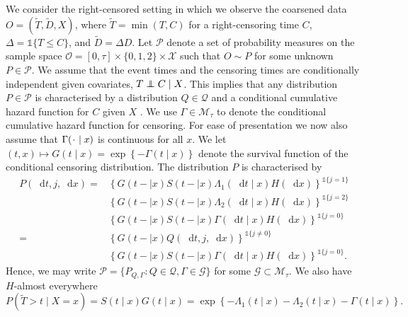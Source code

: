 \documentclass[a4paper,danish]{article}
\theoremstyle{plain} %
\numberwithin{theorem}{section}
\theoremstyle{definition} %
\theoremstyle{remark}
\newcommand{\blank}{\makebox[1ex]{\textbf{$\cdot$}}}
\newcommand\independent{\protect\mathpalette{\protect\independenT}{\perp}}
\def\independenT#1#2{\mathrel{\rlap{$#1#2$}\mkern2mu{#1#2}}}
\newcommand*\diff{\mathop{}\!\mathrm{d}}
\newcommand{\1}{\mathds{1}}
\begin{document}
We consider the right-censored setting in which we observe the coarsened data
\(O = (\tilde{T},\tilde D, X)\), where $\tilde T = \min(T,C)$ for a
right-censoring time \(C\), $\Delta = \1{\{T \leq C\}}$, and
\(\tilde D=\Delta D\). Let \(\mathcal{P}\) denote a set of probability
measures on the sample space
\(\mathcal{O} = [0, \tau] \times \{0, 1, 2\} \times \mathcal{X}\) such
that \(O \sim P \) for some unknown \(P\in \mathcal{P}\). We assume
that the event times and the censoring times are conditionally
independent given covariates, \( T \independent C \mid X \). This
implies that any distribution \( P \in \mathcal{P} \) is characterised
by a distribution \( Q \in \mathcal{Q} \) and a conditional cumulative
hazard function for \( C \) given \( X \)
\citep[c.f.,][]{begun1983information,gill1997coarsening}. We use
\(\Gamma\in\mathcal{M}_{\tau}\) to denote the conditional cumulative hazard
function for censoring. For ease of presentation we now also assume
that \( \Gamma(\blank \mid x) \) is continuous for all \( x \). We let
\((t,x)\mapsto G(t \mid x)=\exp\left\{-\Gamma(t \mid x)\right\}\) denote the
survival function of the conditional censoring distribution. The
distribution \( P \) is characterised by
\begin{equation}\label{eq:parametrizeP}
  \begin{split}
    P(\diff t, j, \diff x) =& \left\{G(t- \mid x)S(t- \mid x)\Lambda_1(\diff t \mid x)H(\diff x)\right\}^{\1{{\{j=1\}}}}\\
                            & \left\{G(t- \mid x)S(t- \mid x)\Lambda_2(\diff t \mid x)H(\diff x)\right\}^{\1{{\{j=2\}}}}\\
                            & \left\{G(t- \mid x)S(t- \mid x)\Gamma(\diff t \mid x)H(\diff x)\right\}^{\1{{\{j=0\}}}}\\
    = & \left\{G(t- \mid x)Q(\diff t,j,\diff x)\right\}^{\1{{\{j\ne 0\}}}}\\    
                            & \left\{G(t- \mid x)S(t- \mid x)\Gamma(\diff t \mid x)H(\diff x)\right\}^{\1{{\{j=0\}}}}.
  \end{split}
\end{equation}
Hence, we may write
\( \mathcal{P} = \{ P_{Q, \Gamma} : Q \in \mathcal{Q}, \Gamma \in
\mathcal{G} \} \) for some \( \mathcal{G} \subset \mathcal{M}_{\tau} \). We
also have \(H\)-almost everywhere
\begin{equation*}
P(\tilde T>t \mid X=x) = S(t \mid x)G(t \mid x) = \exp\left\{-\Lambda_{1}(t \mid x)-\Lambda_{2}(t \mid x)-\Gamma(t \mid x) \right\}.
\end{equation*}
\end{document}
